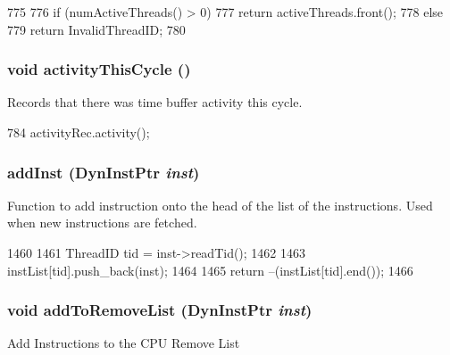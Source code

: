 \begin{DoxyCode}
775     { 
776         if (numActiveThreads() > 0)
777             return activeThreads.front();
778         else
779             return InvalidThreadID;
780     }
\end{DoxyCode}
\hypertarget{classInOrderCPU_ad7e5c2506873e8dc8c71740ac6dabb23}{
\subsubsection[{activityThisCycle}]{\setlength{\rightskip}{0pt plus 5cm}void activityThisCycle ()}}
\label{classInOrderCPU_ad7e5c2506873e8dc8c71740ac6dabb23}
Records that there was time buffer activity this cycle. 


\begin{DoxyCode}
784 { activityRec.activity(); }
\end{DoxyCode}
\hypertarget{classInOrderCPU_ad6588087f5ab8be4ed4bf3b86cbcd577}{
\subsubsection[{addInst}]{ addInst ({\bf DynInstPtr} {\em inst})}}
\label{classInOrderCPU_ad6588087f5ab8be4ed4bf3b86cbcd577}
Function to add instruction onto the head of the list of the instructions. Used when new instructions are fetched. 


\begin{DoxyCode}
1460 {
1461     ThreadID tid = inst->readTid();
1462 
1463     instList[tid].push_back(inst);
1464 
1465     return --(instList[tid].end());
1466 }
\end{DoxyCode}
\hypertarget{classInOrderCPU_a73933add1d7cb3776676ca829cc5e7ed}{
\subsubsection[{addToRemoveList}]{\setlength{\rightskip}{0pt plus 5cm}void addToRemoveList ({\bf DynInstPtr} {\em inst})}}
\label{classInOrderCPU_a73933add1d7cb3776676ca829cc5e7ed}
Add Instructions to the CPU Remove List 


